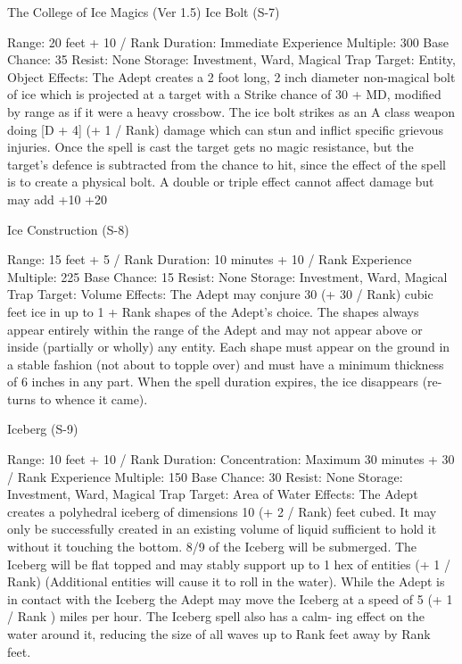 \begin{Chapter}{The College of Ice Magics (Ver 1.5)}
Ice Bolt (S-7) 

Range: 20 feet + 10 / Rank 
Duration: Immediate 
Experience Multiple: 300 
Base Chance: 35%
Resist: None 
Storage: Investment, Ward, Magical Trap 
Target: Entity, Object 
Effects:  The  Adept  creates  a  2  foot  long,  2  inch 
diameter non-magical bolt of ice which is projected 
at a target with a Strike chance of 30%
+  MD,  modified  by  range  as  if  it  were  a  heavy 
crossbow.  The  ice  bolt  strikes  as  an  A  class 
weapon doing [D + 4] (+ 1 / Rank) damage which 
can stun and inflict specific grievous injuries. Once 
the spell is cast the target gets no magic resistance, 
but  the  target’s  defence  is  subtracted  from  the 
chance  to  hit,  since  the  effect  of  the  spell  is  to 
create  a  physical  bolt.  A  double  or  triple  effect 
cannot  affect  damage  but  may  add  +10%
+20%

Ice Construction (S-8) 

Range: 15 feet + 5 / Rank 
Duration: 10 minutes + 10 / Rank 
Experience Multiple: 225 
Base Chance: 15%
Resist: None 
Storage: Investment, Ward, Magical Trap 
Target: Volume 
Effects:  The  Adept  may  conjure  30  (+  30  /  Rank) 
cubic  feet  ice  in  up  to  1  +  Rank  shapes  of  the 
Adept’s choice. The shapes always appear entirely 
within  the  range  of  the  Adept  and  may  not  appear 
above  or  inside  (partially  or  wholly)  any  entity. 
Each  shape  must  appear  on  the  ground  in  a  stable 
fashion (not about to topple over) and must have a 
minimum thickness of  6  inches  in  any  part. When 
the  spell  duration  expires,  the  ice  disappears  (re-
turns to whence it came). 

Iceberg (S-9) 

Range: 10 feet + 10 / Rank 
Duration:  Concentration:  Maximum  30  minutes  + 
30 / Rank 
Experience Multiple: 150 
Base Chance: 30%
Resist: None 
Storage: Investment, Ward, Magical Trap 
Target: Area of Water 
Effects: The  Adept creates a polyhedral iceberg of 
dimensions 10 (+ 2 / Rank) feet cubed. It may only 
be  successfully  created  in  an  existing  volume  of 
liquid  sufficient  to  hold  it  without  it  touching  the 
bottom. 8/9 of the Iceberg will be submerged. The 
Iceberg will be flat topped and may stably support 
up  to  1  hex  of  entities  (+  1  /  Rank)  (Additional 
entities will cause it to roll in the water). While the 
Adept is in contact with the Iceberg the Adept may 
move  the  Iceberg  at  a  speed  of  5  (+  1  /  Rank  ) 
miles  per  hour.  The  Iceberg  spell  also  has  a calm-
ing effect on the water around it, reducing the size 
of all waves up to Rank feet away by Rank feet. 


\end{Chapter}
